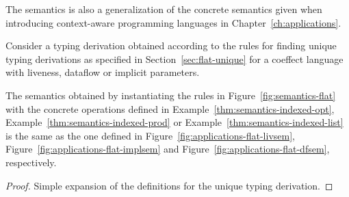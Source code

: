 The semantics is also a generalization of the concrete semantics given when introducing
context-aware programming languages in Chapter~\ref{ch:applications}.

\begin{theorem}[Generalization]
\label{thm:flat-generalization}

Consider a typing derivation obtained according to the rules for finding unique typing derivations
as specified in Section~\ref{sec:flat-unique} for a coeffect language with liveness, dataflow or
implicit parameters.

The semantics obtained by instantiating the rules in Figure~\ref{fig:semantics-flat} with the
concrete operations defined in Example~\ref{thm:semantics-indexed-opt},
Example~\ref{thm:semantics-indexed-prod} or Example~\ref{thm:semantics-indexed-list} is the
same as the one defined in Figure~\ref{fig:applications-flat-livsem},
Figure~\ref{fig:applications-flat-implsem} and Figure~\ref{fig:applications-flat-dfsem},
respectively.
\end{theorem}
\begin{proof}
Simple expansion of the definitions for the unique typing derivation.
\end{proof}


%
%


